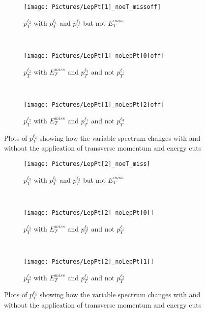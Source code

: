 \begin{figure}[H]
    \centering
    \begin{subfigure}[b]{0.48\textwidth}
        \centering
        \texttt{[image: Pictures/LepPt[1]\_noeT\_missoff]}
    \caption{$p_{T}^{\ell_{2}}$ with $p_{T}^{\ell_{1}}$ and $p_{T}^{\ell_{3}}$ but not $E_{T}^{miss}$}
    \end{subfigure}
    ~
    \begin{subfigure}[b]{0.48\textwidth}
        \centering
        \texttt{[image: Pictures/LepPt[1]\_noLepPt[0]off]}
    \caption{$p_{T}^{\ell_{2}}$ with $E_{T}^{miss}$ and $p_{T}^{\ell_{3}}$ and not $p_{T}^{\ell_{1}}$}    
        \end{subfigure}
    ~
    \begin{subfigure}[b]{0.48\textwidth}
        \centering
        \texttt{[image: Pictures/LepPt[1]\_noLepPt[2]off]}
    \caption{$p_{T}^{\ell_{2}}$ with $E_{T}^{miss}$ and $p_{T}^{\ell_{1}}$ and not $p_{T}^{\ell_{3}}$}    
        \end{subfigure}
\caption{Plots of $p_{T}^{\ell_{2}}$ showing how the variable spectrum changes with and without the application of transverse momentum and energy cuts}
\label{fig:ATLAS}
\end{figure}

\begin{figure}[H]
    \centering
    \begin{subfigure}[b]{0.48\textwidth}
        \centering
        \texttt{[image: Pictures/LepPt[2]\_noeT\_miss]}
    \caption{$p_{T}^{\ell_{3}}$ with $p_{T}^{\ell_{1}}$ and $p_{T}^{\ell_{2}}$ but not $E_{T}^{miss}$}
    \end{subfigure}
    ~
    \begin{subfigure}[b]{0.48\textwidth}
        \centering
        \texttt{[image: Pictures/LepPt[2]\_noLepPt[0]]}
    \caption{$p_{T}^{\ell_{3}}$ with $E_{T}^{miss}$ and $p_{T}^{\ell_{2}}$ and not $p_{T}^{\ell_{1}}$}    
        \end{subfigure}
    ~
    \begin{subfigure}[b]{0.48\textwidth}
        \centering
        \texttt{[image: Pictures/LepPt[2]\_noLepPt[1]]}
    \caption{$p_{T}^{\ell_{3}}$ with $E_{T}^{miss}$ and $p_{T}^{\ell_{1}}$ and not $p_{T}^{\ell_{2}}$}    
        \end{subfigure}
\caption{Plots of $p_{T}^{\ell_{3}}$ showing how the variable spectrum changes with and without the application of transverse momentum and energy cuts}
\label{fig:ATLAS}
\end{figure}











